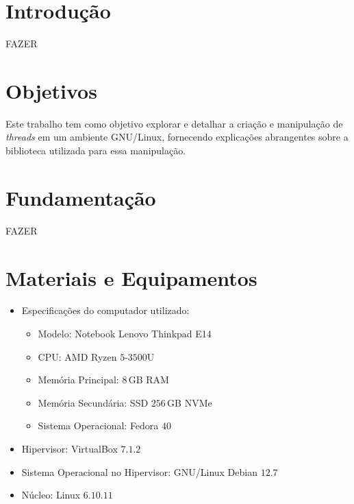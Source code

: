 \documentclass[
	12pt,				%
	oneside,   	        %
	a4paper,			%
	english,			%
	french,				%
	spanish,			%
	brazil,				%
	]{pacotes/abntex2}
\begin{document}
\textual

\makeatletter
\renewcommand{\chapter}{\@gobbletwo}
\makeatother

\section{Introdução}
\label{sec:introducao}
FAZER

\section{Objetivos}
\label{sec:objetivos}

Este trabalho tem como objetivo explorar e detalhar a criação e manipulação de \textit{threads} em um ambiente GNU/Linux, fornecendo explicações abrangentes sobre a biblioteca utilizada para essa manipulação.

\section{Fundamentação}
\label{sec:fundamentacao}
FAZER

\section{Materiais e Equipamentos}
\label{sec:materiais}

\begin{itemize}
  \item Especificações do computador utilizado:
  \begin{itemize}
    \item Modelo: Notebook Lenovo Thinkpad E14
    \item CPU: AMD Ryzen $5$-$3500$U
    \item Memória Principal: $8$\,GB RAM
    \item Memória Secundária: SSD $256$\,GB NVMe
    \item Sistema Operacional: Fedora $40$
  \end{itemize}
  \item Hipervisor: VirtualBox $7.1.2$
  \item Sistema Operacional no Hipervisor: GNU/Linux Debian $12.7$
  \item Núcleo: Linux $6.10.11$
\end{itemize}
\end{document}
